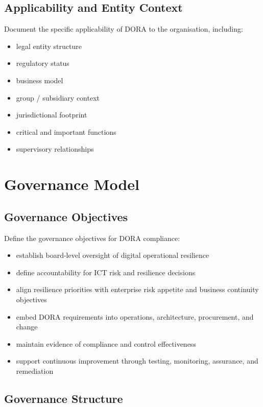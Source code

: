 \documentclass[
  letterpaper,
  DIV=11,
  numbers=noendperiod]{scrartcl}
\providecommand{\tightlist}{%
  \setlength{\itemsep}{0pt}\setlength{\parskip}{0pt}}
\begin{document}
\subsection{Applicability and Entity
Context}\label{applicability-and-entity-context}

Document the specific applicability of DORA to the organisation,
including:

\begin{itemize}
\tightlist
\item
  legal entity structure
\item
  regulatory status
\item
  business model
\item
  group / subsidiary context
\item
  jurisdictional footprint
\item
  critical and important functions
\item
  supervisory relationships
\end{itemize}

\section{Governance Model}\label{governance-model}

\subsection{Governance Objectives}\label{governance-objectives}

Define the governance objectives for DORA compliance:

\begin{itemize}
\tightlist
\item
  establish board-level oversight of digital operational resilience
\item
  define accountability for ICT risk and resilience decisions
\item
  align resilience priorities with enterprise risk appetite and business
  continuity objectives
\item
  embed DORA requirements into operations, architecture, procurement,
  and change
\item
  maintain evidence of compliance and control effectiveness
\item
  support continuous improvement through testing, monitoring, assurance,
  and remediation
\end{itemize}

\subsection{Governance Structure}\label{governance-structure}
\end{document}
